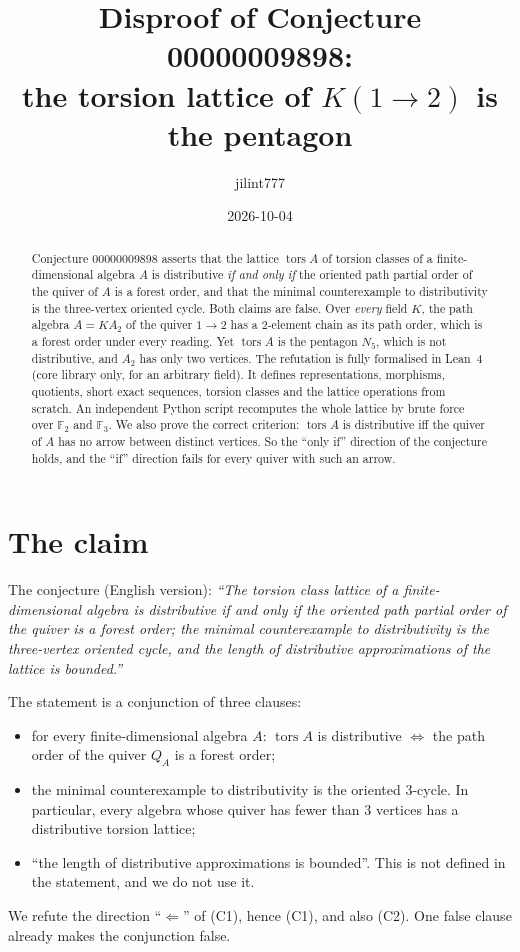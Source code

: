 \documentclass[11pt]{article}
\title{Disproof of Conjecture 00000009898:\\
the torsion lattice of $K(1\to 2)$ is the pentagon}
\author{jilint777}
\date{2026-10-04}
\theoremstyle{definition}
\theoremstyle{remark}
\newcommand{\tors}{\operatorname{tors}}
\begin{document}
\sloppy
\maketitle

\begin{abstract}
Conjecture 00000009898 asserts that the lattice $\tors A$ of torsion classes of a
finite-dimensional algebra $A$ is distributive \emph{if and only if} the oriented path partial
order of the quiver of $A$ is a forest order, and that the minimal counterexample to
distributivity is the three-vertex oriented cycle. Both claims are false. Over \emph{every} field
$K$, the path algebra $A=KA_2$ of the quiver $1\to 2$ has a 2-element chain as its path order,
which is a forest order under every reading. Yet $\tors A$ is the pentagon $N_5$, which is not
distributive, and $A_2$ has only two vertices. The refutation is fully formalised in Lean~4
(core library only, for an arbitrary field). It defines representations, morphisms, quotients,
short exact sequences, torsion classes and the lattice operations from scratch. An independent
Python script recomputes the whole lattice by brute force over $\mathbb F_2$ and $\mathbb F_3$.
We also prove the correct criterion: $\tors A$ is distributive iff the quiver of $A$ has no arrow
between distinct vertices. So the ``only if'' direction of the conjecture holds, and the ``if''
direction fails for every quiver with such an arrow.
\end{abstract}

\section{The claim}

The conjecture (English version): \emph{``The torsion class lattice of a finite-dimensional
algebra is distributive if and only if the oriented path partial order of the quiver is a forest
order; the minimal counterexample to distributivity is the three-vertex oriented cycle, and the
length of distributive approximations of the lattice is bounded.''}

The statement is a conjunction of three clauses:
\begin{itemize}
\item[(C1)] for every finite-dimensional algebra $A$: $\tors A$ is distributive $\iff$ the path
order of the quiver $Q_A$ is a forest order;
\item[(C2)] the minimal counterexample to distributivity is the oriented $3$-cycle. In particular,
every algebra whose quiver has fewer than $3$ vertices has a distributive torsion lattice;
\item[(C3)] ``the length of distributive approximations is bounded''. This is not defined in the
statement, and we do not use it.
\end{itemize}
We refute the direction ``$\Leftarrow$'' of (C1), hence (C1), and also (C2). One false clause
already makes the conjunction false.
\end{document}
